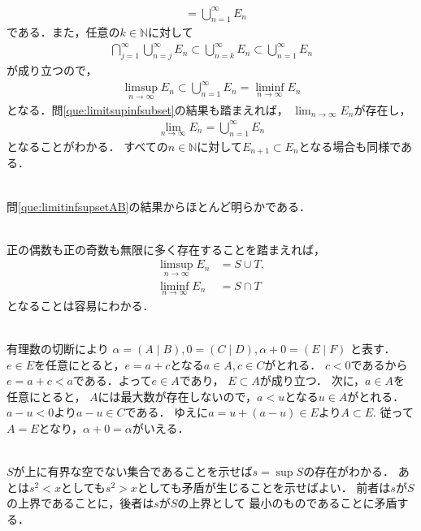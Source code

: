 \begin{description}
\begin{align*}
    & = \bigcup_{n=1}^{\infty} E_n
  \end{align*}
  である．また，任意の$k \in \mathbb{N}$に対して
  \begin{align*}
    \bigcap_{j=1}^{\infty} \bigcup_{n=j}^{\infty} E_n 
    \subset \bigcup_{n=k}^{\infty} E_n \subset \bigcup_{n=1}^{\infty} E_n
  \end{align*}
  が成り立つので，
  \begin{align*}
    \limsup_{n \to \infty} E_n \subset \bigcup_{n=1}^{\infty} E_n
    = \liminf_{n \to \infty}E_n
  \end{align*}
  となる．問\ref{que:limitsupinfsubset}の結果も踏まえれば，
  $\displaystyle \lim_{n \to \infty} E_n $が存在し，
  \begin{align*}
    \lim_{n \to \infty} E_n = \bigcup_{n=1}^{\infty} E_n
  \end{align*}
  となることがわかる．
  すべての$n \in \mathbb{N}$に対して$E_{n+1} \subset E_n$となる場合も同様である．
\item[\refque{que:limitsetcupcap}] \mbox{} \\
  問\ref{que:limitinfsupsetAB}の結果からほとんど明らかである．
\item[\refque{que:limitsetoddeven}] \mbox{} \\
  正の偶数も正の奇数も無限に多く存在することを踏まえれば，
  \begin{align*}
    \limsup_{n \to \infty} E_n & = S \cup T , \\
    \liminf_{n \to \infty} E_n & = S \cap T
  \end{align*}
  となることは容易にわかる．
\item[\refque{que:sumunitele}] \mbox{} \\
  有理数の切断により
  $\alpha = ( A \mid B) ,  0 = (C \mid D),  \alpha + 0 = (E \mid F)$
  と表す．
  $e \in E$を任意にとると，$e= a+c$となる$a \in A ,  c \in C$がとれる．
  $c <0$であるから$e= a+c<a$である．よって$e \in A$であり，
  $E \subset A$が成り立つ．
  次に，$a \in A$を任意にとると，
  $A$には最大数が存在しないので，$a < u$となる$u \in A$がとれる．
  $a-u <0$より$a-u \in C$である．
  ゆえに$a= u + (a-u) \in E$より$A \subset E.$
  従って$A= E$となり，$\alpha + 0 = \alpha$がいえる．
\item[\refque{que:sqrtdef}] \mbox{} \\
  $S$が上に有界な空でない集合であることを示せば$s= \sup S$の存在がわかる．
  あとは$s^2<x$としても$s^2>x$としても矛盾が生じることを示せばよい．
  前者は$s$が$S$の上界であることに，後者は$s$が$S$の上界として
  最小のものであることに矛盾する．

\end{description}
